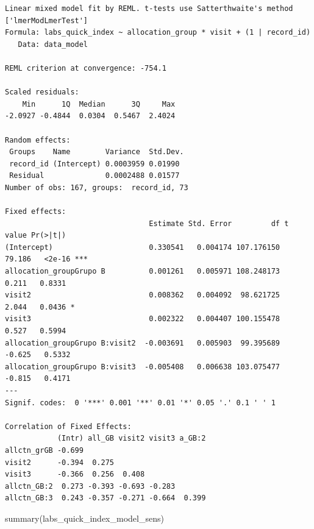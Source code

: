 \documentclass[
  12pt,
]{article}
\newenvironment{Shaded}{\begin{snugshade}}{\end{snugshade}}
\newcommand{\FunctionTok}[1]{\textcolor[rgb]{0.28,0.35,0.67}{#1}}
\newcommand{\NormalTok}[1]{\textcolor[rgb]{0.00,0.23,0.31}{#1}}
\begin{document}
\begin{verbatim}
Linear mixed model fit by REML. t-tests use Satterthwaite's method ['lmerModLmerTest']
Formula: labs_quick_index ~ allocation_group * visit + (1 | record_id)
   Data: data_model

REML criterion at convergence: -754.1

Scaled residuals: 
    Min      1Q  Median      3Q     Max 
-2.0927 -0.4844  0.0304  0.5467  2.4024 

Random effects:
 Groups    Name        Variance  Std.Dev.
 record_id (Intercept) 0.0003959 0.01990 
 Residual              0.0002488 0.01577 
Number of obs: 167, groups:  record_id, 73

Fixed effects:
                                 Estimate Std. Error         df t value Pr(>|t|)    
(Intercept)                      0.330541   0.004174 107.176150  79.186   <2e-16 ***
allocation_groupGrupo B          0.001261   0.005971 108.248173   0.211   0.8331    
visit2                           0.008362   0.004092  98.621725   2.044   0.0436 *  
visit3                           0.002322   0.004407 100.155478   0.527   0.5994    
allocation_groupGrupo B:visit2  -0.003691   0.005903  99.395689  -0.625   0.5332    
allocation_groupGrupo B:visit3  -0.005408   0.006638 103.075477  -0.815   0.4171    
---
Signif. codes:  0 '***' 0.001 '**' 0.01 '*' 0.05 '.' 0.1 ' ' 1

Correlation of Fixed Effects:
            (Intr) all_GB visit2 visit3 a_GB:2
allctn_grGB -0.699                            
visit2      -0.394  0.275                     
visit3      -0.366  0.256  0.408              
allctn_GB:2  0.273 -0.393 -0.693 -0.283       
allctn_GB:3  0.243 -0.357 -0.271 -0.664  0.399
\end{verbatim}

\begin{Shaded}
\begin{Highlighting}[]
\FunctionTok{summary}\NormalTok{(labs\_quick\_index\_model\_sens)}
\end{Highlighting}
\end{Shaded}
\end{document}
